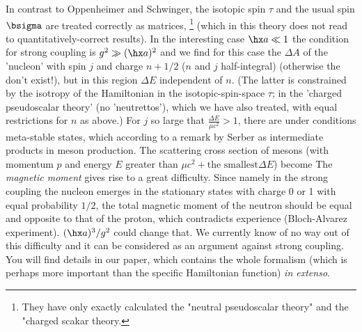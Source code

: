 In contrast to Oppenheimer and Schwinger, the isotopic spin $\tau$ and the usual spin $\bsigma$ are treated correctly as matrices, \footnote{They have only exactly calculated the "neutral pseudoscalar theory" and the "charged scakar theory.} (which in this theory does not read to quantitatively-correct results). In the interesting case $\hx a \ll 1$ the condition for strong coupling is $g^2 \gg (\hx a)^2$ and we find for this case the  $\Delta A$ of the 'nucleon' with spin $j$ and charge $n+1/2$ ($n$ and $j$ half-integral)
(otherwise the  don't exist!), but in this region $\Delta E$ independent of $n$. (The latter is constrained by the isotropy of the Hamiltonian in the isotopic-spin-space $\tau$; in the 'charged pseudoscalar theory' (no 'neutrettos'), which we have also treated,
with equal restrictions for $n$ as above.) For $j$ so large that $\frac{\Delta E}{\mu c^2} > 1$, there are under  conditions meta-stable states, which according to a remark by Serber  as intermediate products in meson production. The scattering cross section of mesons (with momentum $p$ and energy $E$ greater than $\mu c^2 + \text{the smallest} \Delta E$) become
The \textit{magnetic moment} gives rise to a great difficulty. Since namely in the strong coupling the nucleon emerges in the stationary states with charge 0 or 1 with equal probability $1/2$, the total magnetic moment of the neutron should be equal and opposite to that of the proton, which contradicts experience (Bloch-Alvarez experiment).  $(\hx a)^3/g^2$ could change that. We currently know of no way out of this difficulty and it can be considered as an argument against strong coupling. You will find details in our paper, which contains the whole formalism (which is perhaps more important than the specific Hamiltonian function) \textit{in extenso}.


